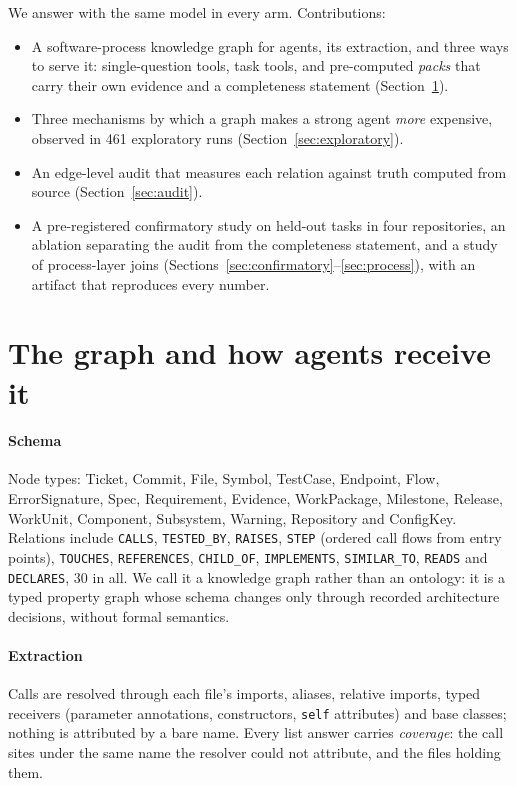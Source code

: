 \documentclass[conference]{IEEEtran}
\begin{document}
We answer with the same model in every arm. Contributions:
\begin{itemize}
\item A software-process knowledge graph for agents, its extraction, and three ways to serve it: single-question
  tools, task tools, and pre-computed \emph{packs} that carry their own evidence and a completeness statement
  (Section~\ref{sec:system}).
\item Three mechanisms by which a graph makes a strong agent \emph{more} expensive, observed in 461 exploratory runs
  (Section~\ref{sec:exploratory}).
\item An edge-level audit that measures each relation against truth computed from source (Section~\ref{sec:audit}).
\item A pre-registered confirmatory study on held-out tasks in four repositories, an ablation separating the audit
  from the completeness statement, and a study of process-layer joins (Sections~\ref{sec:confirmatory}--\ref{sec:process}),
  with an artifact that reproduces every number.
\end{itemize}

\section{The graph and how agents receive it}\label{sec:system}
\paragraph{Schema} Node types: Ticket, Commit, File, Symbol, TestCase, Endpoint, Flow, ErrorSignature, Spec,
Requirement, Evidence, WorkPackage, Milestone, Release, WorkUnit, Component, Subsystem, Warning, Repository and
ConfigKey. Relations include \texttt{CALLS}, \texttt{TESTED\_BY}, \texttt{RAISES}, \texttt{STEP} (ordered call flows
from entry points), \texttt{TOUCHES}, \texttt{REFERENCES}, \texttt{CHILD\_OF}, \texttt{IMPLEMENTS},
\texttt{SIMILAR\_TO}, \texttt{READS} and \texttt{DECLARES}, 30 in all. We call it a knowledge graph rather than an
ontology: it is a typed property graph whose schema changes only through recorded architecture decisions, without
formal semantics.
\paragraph{Extraction} Calls are resolved through each file's imports, aliases, relative imports, typed receivers
(parameter annotations, constructors, \texttt{self} attributes) and base classes; nothing is attributed by a bare name.
Every list answer carries \emph{coverage}: the call sites under the same name the resolver could not attribute, and the
files holding them.
\end{document}
